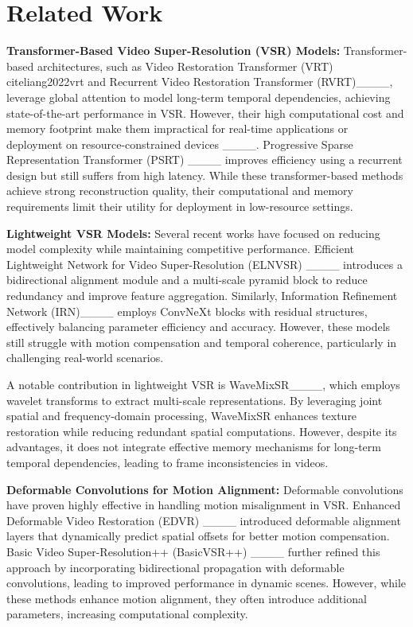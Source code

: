 \section{Related Work}
\label{sec:related_work}

\textbf{Transformer-Based Video Super-Resolution (VSR) Models:} 
Transformer-based architectures, such as Video Restoration Transformer (VRT) cite{liang2022vrt} and Recurrent Video Restoration Transformer (RVRT)____, leverage global attention to model long-term temporal dependencies, achieving state-of-the-art performance in VSR. However, their high computational cost and memory footprint make them impractical for real-time applications or deployment on resource-constrained devices ____. Progressive Sparse Representation Transformer (PSRT) ____ improves efficiency using a recurrent design but still suffers from high latency. While these transformer-based methods achieve strong reconstruction quality, their computational and memory requirements limit their utility for deployment in low-resource settings.

\textbf{Lightweight VSR Models:} 
Several recent works have focused on reducing model complexity while maintaining competitive performance. Efficient Lightweight Network for Video Super-Resolution (ELNVSR) ____ introduces a bidirectional alignment module and a multi-scale pyramid block to reduce redundancy and improve feature aggregation. Similarly, Information Refinement Network (IRN)____ employs ConvNeXt blocks with residual structures, effectively balancing parameter efficiency and accuracy. However, these models still struggle with motion compensation and temporal coherence, particularly in challenging real-world scenarios.  

A notable contribution in lightweight VSR is WaveMixSR____, which employs wavelet transforms to extract multi-scale representations. By leveraging joint spatial and frequency-domain processing, WaveMixSR enhances texture restoration while reducing redundant spatial computations. However, despite its advantages, it does not integrate effective memory mechanisms for long-term temporal dependencies, leading to frame inconsistencies in videos.

\textbf{Deformable Convolutions for Motion Alignment:}  
Deformable convolutions have proven highly effective in handling motion misalignment in VSR. Enhanced Deformable Video Restoration (EDVR) ____ introduced deformable alignment layers that dynamically predict spatial offsets for better motion compensation. Basic Video Super-Resolution++ (BasicVSR++) ____ further refined this approach by incorporating bidirectional propagation with deformable convolutions, leading to improved performance in dynamic scenes. However, while these methods enhance motion alignment, they often introduce additional parameters, increasing computational complexity.  

